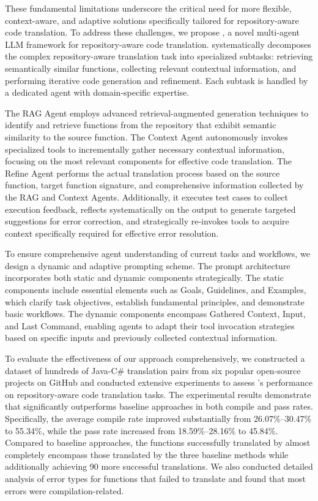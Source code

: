 These fundamental limitations underscore the critical need for more flexible, context-aware, and adaptive solutions specifically tailored for repository-aware code translation. To address these challenges, we propose \toolname, a novel multi-agent LLM framework for repository-aware code translation. \toolname systematically decomposes the complex repository-aware translation task into specialized subtasks: retrieving semantically similar functions, collecting relevant contextual information, and performing iterative code generation and refinement. Each subtask is handled by a dedicated agent with domain-specific expertise.

The RAG Agent employs advanced retrieval-augmented generation techniques to identify and retrieve functions from the repository that exhibit semantic similarity to the source function. The Context Agent autonomously invokes specialized tools to incrementally gather necessary contextual information, focusing on the most relevant components for effective code translation. The Refine Agent performs the actual translation process based on the source function, target function signature, and comprehensive information collected by the RAG and Context Agents. Additionally, it executes test cases to collect execution feedback, reflects systematically on the output to generate targeted suggestions for error correction, and strategically re-invokes tools to acquire context specifically required for effective error resolution.

To ensure comprehensive agent understanding of current tasks and workflows, we design a dynamic and adaptive prompting scheme. The prompt architecture incorporates both static and dynamic components strategically. The static components include essential elements such as Goals, Guidelines, and Examples, which clarify task objectives, establish fundamental principles, and demonstrate basic workflows. The dynamic components encompass Gathered Context, Input, and Last Command, enabling agents to adapt their tool invocation strategies based on specific inputs and previously collected contextual information.

To evaluate the effectiveness of our approach comprehensively, we constructed a dataset of hundreds of Java-C\# translation pairs from six popular open-source projects on GitHub and conducted extensive experiments to assess \toolname's performance on repository-aware code translation tasks. The experimental results demonstrate that \toolname significantly outperforms baseline approaches in both compile and pass rates. Specifically, the average compile rate improved substantially from 26.07\%–30.47\% to 55.34\%, while the pass rate increased from 18.59\%–28.16\% to 45.84\%. Compared to baseline approaches, the functions successfully translated by \toolname almost completely encompass those translated by the three baseline methods while additionally achieving 90 more successful translations. We also conducted detailed analysis of error types for functions that \toolname failed to translate and found that most errors were compilation-related.


